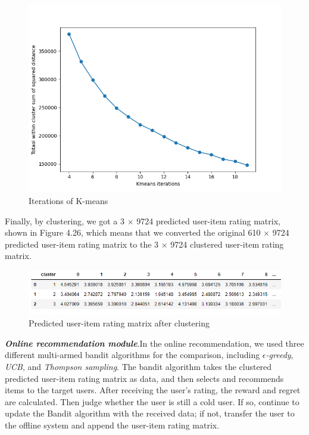 \begin{figure}[htbp]
    \centering
    \includegraphics[scale=0.6]{figure/clu1.png}
    \caption{Iterations of K-means}
\end{figure}

Finally, by clustering, we got a 3 $\times$ 9724 predicted user-item rating matrix, shown in Figure 4.26, which means that we converted the original 610 $\times$ 9724 predicted user-item rating matrix to the 3 $\times$ 9724 clustered user-item rating matrix.
\begin{figure}[htbp]
    \centering
    \includegraphics[scale=0.6]{figure/exs4.png}
    \caption{Predicted user-item rating matrix after clustering}
\end{figure}

\textbf{\textit{Online recommendation module}}.In the online recommendation, we used three different multi-armed bandit algorithms for the comparison, including \textit{$\epsilon$-greedy}, \textit{UCB}, and \textit{Thompson sampling}. The bandit algorithm takes the clustered predicted user-item rating matrix as data, and then selects and recommends items to the target users. After receiving the user's rating, the reward and regret are calculated. Then judge whether the user is still a cold user. If so, continue to update the Bandit algorithm with the received data; if not, transfer the user to the offline system and append the user-item rating matrix.

